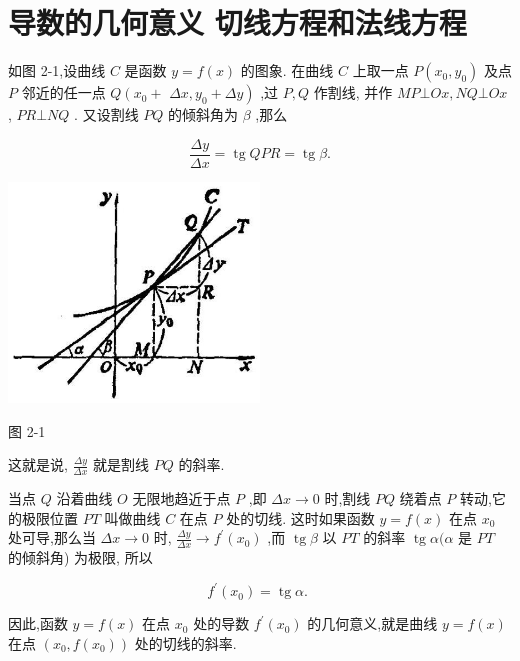 \documentclass[lang=cn,newtx,12pt,scheme=chinese]{elegantbook}
\begin{document}
\section{导数的几何意义 切线方程和法线方程}

如图 2-1,设曲线 \(C\) 是函数 \(y = f\left( x\right)\) 的图象. 在曲线 \(C\) 上取一点 \(P\left( {{x}_{0},{y}_{0}}\right)\) 及点 \(P\) 邻近的任一点 \(Q\left( {{x}_{0} + }\right.\) \(\left. {{\Delta x},{y}_{0} + {\Delta y}}\right)\) ,过 \(P,Q\) 作割线, 并作 \({MP} \bot {Ox},{NQ} \bot {Ox}\) , \({PR} \bot {NQ}\) . 又设割线 \({PQ}\) 的倾斜角为 \(\beta\) ,那么

\[
\frac{\Delta y}{\Delta x} = \operatorname{tg}{QPR} = \operatorname{tg}\beta .
\]

\begin{center}
\includegraphics[max width=0.5\textwidth]{images/01912c18-5c3f-733d-b775-749ba9897a9d_62_329591.jpg}
\end{center}

图 2-1

这就是说, \(\frac{\Delta y}{\Delta x}\) 就是割线 \({PQ}\) 的斜率.

当点 \(Q\) 沿着曲线 \(O\) 无限地趋近于点 \(P\) ,即 \({\Delta x} \rightarrow 0\) 时,割线 \({PQ}\) 绕着点 \(P\) 转动,它的极限位置 \({PT}\) 叫做曲线 \(C\) 在点 \(P\) 处的切线. 这时如果函数 \(y = f\left( x\right)\) 在点 \({x}_{0}\) 处可导,那么当 \({\Delta x} \rightarrow 0\) 时, \(\frac{\Delta y}{\Delta x} \rightarrow {f}^{\prime }\left( {x}_{0}\right)\) ,而 \(\operatorname{tg}\beta\) 以 \({PT}\) 的斜率 \(\operatorname{tg}\alpha (\alpha\) 是 \({PT}\) 的倾斜角) 为极限, 所以

\[
{f}^{\prime }\left( {x}_{0}\right) = \operatorname{tg}\alpha \text{. }
\]

因此,函数 \(y = f\left( x\right)\) 在点 \({x}_{0}\) 处的导数 \({f}^{\prime }\left( {x}_{0}\right)\) 的几何意义,就是曲线 \(y = f\left( x\right)\) 在点 \(\left( {{x}_{0},f\left( {x}_{0}\right) }\right)\) 处的切线的斜率.
\end{document}
